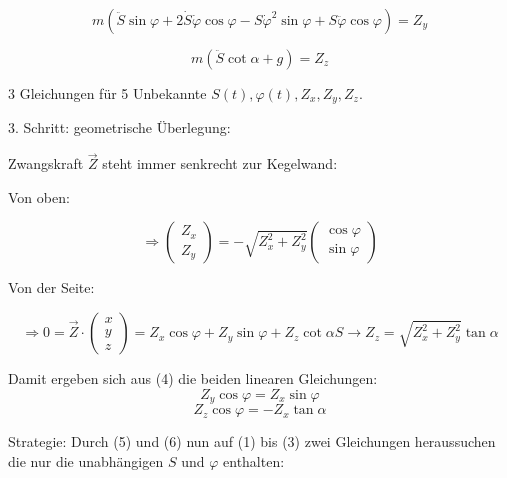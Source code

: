 \documentclass[10pt, letterpaper]{article}
\begin{document}
\begin{equation}
m(\ddot{S}\sin\varphi + 2\dot{S}\dot{\varphi}\cos\varphi - S\dot{\varphi}^2\sin\varphi + S\ddot{\varphi}\cos\varphi) = Z_y \tag{2}
\end{equation}

\begin{equation}
m(\ddot{S}\cot\alpha + g) = Z_z \tag{3}
\end{equation}

3 Gleichungen für 5 Unbekannte $S(t), \varphi(t), Z_x, Z_y, Z_z$.

3. Schritt: geometrische Überlegung: 

Zwangskraft $\vec{Z}$ steht immer senkrecht zur Kegelwand:


Von oben: 

\[\Rightarrow \begin{pmatrix} Z_x \\ Z_y \end{pmatrix} = -\sqrt{Z_x^2+Z_y^2}\begin{pmatrix} \cos\varphi \\ \sin\varphi \end{pmatrix} \tag{4}\]

Von der Seite: 
\[\Rightarrow 0 = \vec{Z} \cdot \begin{pmatrix} x \\ y \\ z \end{pmatrix} = Z_x\cos\varphi + Z_y\sin\varphi+Z_z\cot\alpha S \rightarrow Z_z = \sqrt{Z_x^2+Z_y^2}\tan\alpha\]

Damit ergeben sich aus (4) die beiden linearen Gleichungen:
\[Z_y \cos\varphi = Z_x \sin\varphi \tag{5}\]
\[Z_z \cos\varphi = -Z_x \tan\alpha \tag{6}\]

Strategie: Durch (5) und (6) nun auf (1) bis (3) zwei Gleichungen heraussuchen die nur die unabhängigen $S$ und $\varphi$ enthalten:
\end{document}
